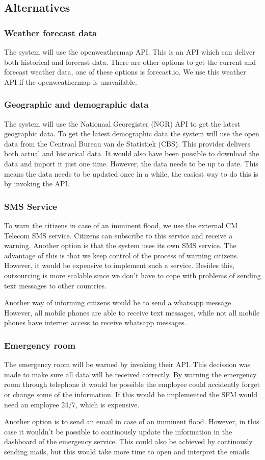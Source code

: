 \subsection{Alternatives}
\subsubsection*{Weather forecast data}
The system will use the openweathermap API. This is an API which can deliver both historical and forecast data. There are other options to get the current and forecast weather data, one of these options is forecast.io. We use this weather API if the openweathermap is unavailable. 

\subsubsection*{Geographic and demographic data}
The system will use the Nationaal Georegister (NGR) API to get the latest geographic data. To get the latest demographic data the system will use the open data from the Centraal Bureau van de Statistiek (CBS). This provider delivers both actual and historical data. It would also have been possible to download the data and import it just one time. However, the data needs to be up to date. This means the data needs to be updated once in a while, the easiest way to do this is by invoking the API.

\subsubsection*{SMS Service}
To warn the citizens in case of an imminent flood, we use the external CM Telecom SMS service. Citizens can subscribe to this service and receive a warning. Another option is that the system uses its own SMS service. The advantage of this is that we keep control of the process of warning citizens. However, it would be expensive to implement such a service. Besides this, outsourcing is more scalable since we don't have to cope with problems of sending text messages to other countries.

Another way of informing citizens would be to send a whatsapp message. However, all mobile phones are able to receive text messages, while not all mobile phones have internet access to receive whatsapp messages.  

\subsubsection*{Emergency room}
The emergency room will be warned by invoking their API. This decission was made to make sure all data will be received correctly. By warning the emergency room through telephone it would be possible the employee could accidently forget or change some of the information. If this would be implemented the SFM would need an employee 24/7, which is expensive. 

Another option is to send an email in case of an imminent flood. However, in this case it wouldn't be possible to continously update the information in the dashboard of the emergency service. This could also be achieved by continously sending mails, but this would take more time to open and interpret the emails.


